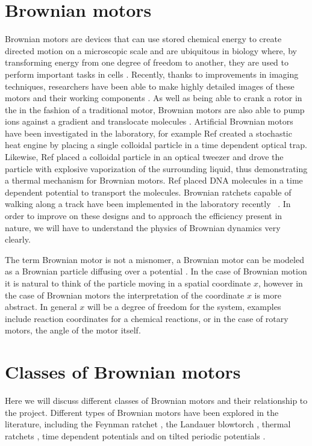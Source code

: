 \section{Brownian motors}
Brownian motors are devices that can use stored chemical energy to create directed motion on a microscopic scale and are ubiquitous in biology where, by transforming energy from one degree of freedom to another, they are used to perform important tasks in cells \cite{PhillipsQuakeMay2006, Magnasco1994,Nelson2014}. Recently, thanks to improvements in imaging techniques, researchers have been able to make highly detailed images of these motors and their working components \cite{YiWeiChang2016}. As well as being able to crank a rotor in the in the fashion of a traditional motor, Brownian motors are also able to pump ions against a gradient and translocate molecules \cite{Magnasco1994, Reimann2001, Leibler1993, leibler1990physical}. Artificial Brownian motors have been investigated in the laboratory, for example Ref \cite{BlickleBechinger2011} created a stochastic heat engine by placing a single colloidal particle in a time dependent optical trap. Likewise, Ref \cite{Pedro2014} placed a colloidal particle in an optical tweezer and drove the particle with explosive vaporization of the surrounding liquid, thus demonstrating a thermal mechanism for Brownian motors. Ref \cite{JoelBader1999} placed DNA molecules in a time dependent potential to transport the molecules. Brownian ratchets capable of walking along a track have been implemented in the laboratory recently  ~\cite{Wang2010,DeliusGeertsemaLeigh2010,DeliusGeertsemaLeighEtAl2010}. In order to improve on these designs and to approach the efficiency present in nature, we will have to understand the physics of Brownian dynamics very clearly.

The term Brownian motor is not a misnomer, a Brownian motor can be modeled as a Brownian particle diffusing over a potential \cite{Reimann2001}. In the case of Brownian motion it is natural to think of the particle moving in a spatial coordinate $x$, however in the case of Brownian motors the interpretation of the coordinate $x$ is more abstract. In general $x$ will be a degree of freedom for the system, examples include reaction coordinates for a chemical reactions, or in the case of rotary motors, the angle of the motor itself.

\section{Classes of Brownian motors} \label{BrownianMotorClasses}
Here we will discuss different classes of Brownian motors and their relationship to the project. Different types of Brownian motors have been explored in the literature, including the Feynman ratchet \cite{Feynman1963}, the Landauer blowtorch \cite{Landauer1988}, thermal ratchets \cite{Pedro2014}, time dependent potentials \cite{JoelBader1999,BlickleBechinger2011} and on tilted periodic potentials \cite{Leibler1993,Magnasco1994}.

